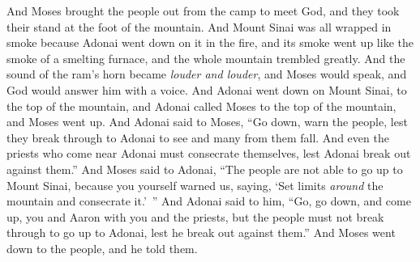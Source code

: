 \begin{biblechapter}
\verse And Moses brought the people out from the camp to meet God, and they took their stand at the foot of the mountain.
\verse And Mount Sinai was all wrapped in smoke because Adonai went down on it in the fire, and its smoke went up like the smoke of a smelting furnace, and the whole mountain trembled greatly.
\verse And the sound of the ram’s horn became \textit{louder and louder}, and Moses would speak, and God would answer him with a voice.
\verse And Adonai went down on Mount Sinai, to the top of the mountain, and Adonai called Moses to the top of the mountain, and Moses went up.
\verse And Adonai said to Moses, “Go down, warn the people, lest they break through to Adonai to see and many from them fall.
\verse And even the priests who come near Adonai must consecrate themselves, lest Adonai break out against them.”
\verse And Moses said to Adonai, “The people are not able to go up to Mount Sinai, because you yourself warned us, saying, ‘Set limits \textit{around} the mountain and consecrate it.’ ”
\verse And Adonai said to him, “Go, go down, and come up, you and Aaron with you and the priests, but the people must not break through to go up to Adonai, lest he break out against them.”
\verse And Moses went down to the people, and he told them.
\end{biblechapter}

